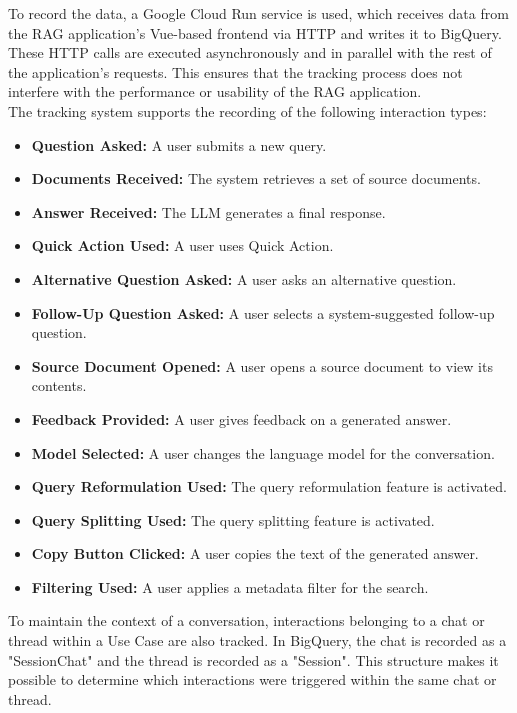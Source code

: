 \documentclass[
	english,
	ruledheaders=section,%
	class=report,%
	thesis={type=bachelor},%
	accentcolor=1b,%
	custommargins=true,%
	marginpar=false,%
	parskip=half-,%
	fontsize=11pt,%
	DIV=14,
]{tudapub}
\begin{document}
To record the data, a Google Cloud Run service \parencite{GoogleCloudRunService} is used, which receives data from the RAG application's Vue-based \parencite{vuejs} frontend via HTTP and writes it to BigQuery. These HTTP calls are executed asynchronously and in parallel with the rest of the application's requests. This ensures that the tracking process does not interfere with the performance or usability of the RAG application.
\\
The tracking system supports the recording of the following interaction types:
\begin{itemize}
    \item \textbf{Question Asked:} A user submits a new query.
    \item \textbf{Documents Received:} The system retrieves a set of source documents.
    \item \textbf{Answer Received:} The LLM generates a final response.
    \item \textbf{Quick Action Used:} A user uses Quick Action.
    \item \textbf{Alternative Question Asked:} A user asks an alternative question.
    \item \textbf{Follow-Up Question Asked:} A user selects a system-suggested follow-up question.
    \item \textbf{Source Document Opened:} A user opens a source document to view its contents.
    \item \textbf{Feedback Provided:} A user gives feedback on a generated answer.
    \item \textbf{Model Selected:} A user changes the language model for the conversation.
    \item \textbf{Query Reformulation Used:} The query reformulation feature is activated.
    \item \textbf{Query Splitting Used:} The query splitting feature is activated.
    \item \textbf{Copy Button Clicked:} A user copies the text of the generated answer.
    \item \textbf{Filtering Used:} A user applies a metadata filter for the search.
\end{itemize}
To maintain the context of a conversation, interactions belonging to a chat or thread within a Use Case are also tracked. In BigQuery, the chat is recorded as a "SessionChat" and the thread is recorded as a "Session". This structure makes it possible to determine which interactions were triggered within the same chat or thread.
\end{document}
